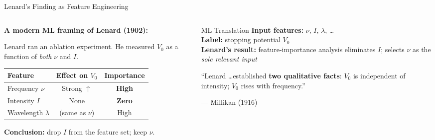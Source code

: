 \documentclass[aspectratio=169,12pt]{beamer}
\begin{document}
\begin{frame}[shrink=5]{Lenard's Finding as Feature Engineering}

\begin{columns}[T]
\begin{column}{0.52\textwidth}
\textbf{A modern ML framing of Lenard (1902):}

\bigskip
Lenard ran an ablation experiment.  He measured $V_0$ as a function of
\emph{both} $\nu$ and $I$.

\bigskip
\begin{tabular}{lcc}
\toprule
Feature & Effect on $V_0$ & Importance \\
\midrule
Frequency $\nu$ & Strong $\uparrow$ & \textcolor{mlgreen}{\textbf{High}} \\
Intensity $I$  & None             & \textcolor{datared}{\textbf{Zero}} \\
Wavelength $\lambda$ & (same as $\nu$) & High \\
\bottomrule
\end{tabular}

\bigskip
\textbf{Conclusion:} drop $I$ from the feature set; keep $\nu$.
\end{column}
\begin{column}{0.45\textwidth}
\begin{block}{ML Translation}
\textbf{Input features:} $\nu$, $I$, $\lambda$, \ldots\\[4pt]
\textbf{Label:} stopping potential $V_0$\\[4pt]
\textbf{Lenard's result:} feature-importance
analysis eliminates $I$;
selects $\nu$ as the
\emph{sole relevant input}
\end{block}

\bigskip
``Lenard \ldots established \textbf{two qualitative
facts}: $V_0$ is independent of
intensity; $V_0$ rises with frequency.''

\smallskip
\hfill\small{--- Millikan (1916)}
\end{column}
\end{columns}

\end{frame}
\end{document}
